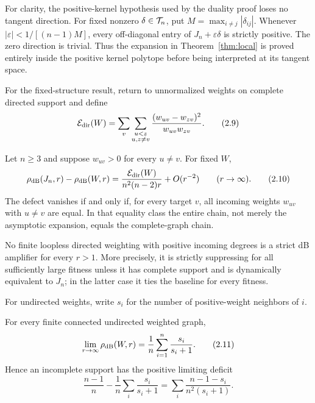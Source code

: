 For clarity, the positive-kernel hypothesis used by the duality proof loses
no tangent direction.  For fixed nonzero $\delta\in\mathcal T_n$, put
$M=\max_{i\ne j}|\delta_{ij}|$.  Whenever
$|\varepsilon|<1/[(n-1)M]$, every off-diagonal entry of
$J_n+\varepsilon\delta$ is strictly positive.  The zero direction is
trivial.  Thus the expansion in Theorem~\ref{thm:local} is proved entirely
inside the positive kernel polytope before being interpreted at its tangent
space.

For the fixed-structure result, return to unnormalized weights on complete
directed support and define
\[
 \mathcal E_{\rm dir}(W)=
 \sum_v\sum_{\substack{u<z\\u,z\ne v}}
 \frac{(w_{uv}-w_{zv})^2}{w_{uv}w_{zv}}.                   \tag{2.9}\label{2.9}
\]

\begin{theorem}
\label{thm:strong-complete}
Let $n\ge3$ and suppose $w_{uv}>0$ for every $u\ne v$.  For fixed $W$,
\[
 \rho_{\mathrm{dB}}(J_n,r)-\rho_{\mathrm{dB}}(W,r)
 =\frac{\mathcal E_{\rm dir}(W)}{n^2(n-2)r}+O(r^{-2})
 \qquad(r\to\infty).                                      \tag{2.10}\label{2.10}
\]
The defect vanishes if and only if, for every target $v$, all incoming
weights $w_{uv}$ with $u\ne v$ are equal.  In that equality class the entire
chain, not merely the asymptotic expansion, equals the complete-graph chain.
\end{theorem}

\begin{corollary}
\label{cor:fixed}
No finite loopless directed weighting with positive incoming degrees is a
strict dB amplifier for every $r>1$.  More precisely, it is strictly
suppressing for all sufficiently large fitness unless it has complete
support and is dynamically equivalent to $J_n$; in the latter case it ties
the baseline for every fitness.
\end{corollary}

For undirected weights, write $s_i$ for the number of positive-weight
neighbors of $i$.

\begin{proposition}\label{prop:support-limit}
For every finite connected undirected weighted graph,
\[
 \lim_{r\to\infty}\rho_{\mathrm{dB}}(W,r)
 =\frac1n\sum_{i=1}^n\frac{s_i}{s_i+1}.                     \tag{2.11}\label{2.11}
\]
Hence an incomplete support has the positive limiting deficit
\[
 \frac{n-1}{n}-\frac1n\sum_i\frac{s_i}{s_i+1}
 =\sum_i\frac{n-1-s_i}{n^2(s_i+1)}.                         \tag{2.12}\label{2.12}
\]
\end{proposition}

